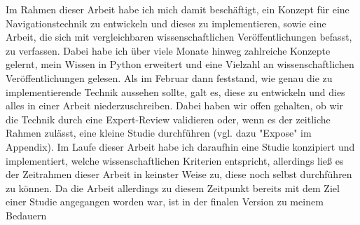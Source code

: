 Im Rahmen dieser Arbeit habe ich mich damit beschäftigt, ein Konzept für eine Navigationstechnik zu entwickeln und dieses zu implementieren, sowie eine Arbeit, die sich mit vergleichbaren wissenschaftlichen Veröffentlichungen befasst, zu verfassen. Dabei habe ich über viele Monate hinweg zahlreiche Konzepte gelernt, mein Wissen in Python erweitert und eine Vielzahl an wissenschaftlichen Veröffentlichungen gelesen. Als im Februar dann feststand, wie genau die zu implementierende Technik aussehen sollte, galt es, diese zu entwickeln und dies alles in einer Arbeit niederzuschreiben. Dabei haben wir offen gehalten, ob wir die Technik durch eine Expert-Review validieren oder, wenn es der zeitliche Rahmen zulässt, eine kleine Studie durchführen (vgl. dazu "Expose" im Appendix). Im Laufe dieser Arbeit habe ich daraufhin eine Studie konzipiert und implementiert, welche wissenschaftlichen Kriterien entspricht, allerdings ließ es der Zeitrahmen dieser Arbeit in keinster Weise zu, diese noch selbst durchführen zu können. Da die Arbeit allerdings zu diesem Zeitpunkt bereits mit dem Ziel einer Studie angegangen worden war, ist in der finalen Version zu meinem Bedauern